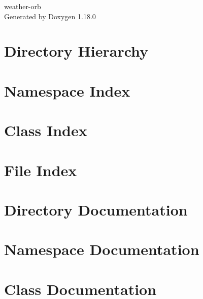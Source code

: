 \documentclass[twoside]{book}
\newcommand{\+}{\discretionary{\mbox{\scriptsize$\hookleftarrow$}}{}{}}
\newcommand{\clearemptydoublepage}{%
    \newpage{\pagestyle{empty}\cleardoublepage}%
  }
\begin{document}
  \raggedbottom
    \hypersetup{pageanchor=false,
                bookmarksnumbered=true,
                pdfencoding=unicode
               }
  \begin{titlepage}
  \vspace*{7cm}
  \begin{center}%
  {\Large weather-\/orb}\\
  \vspace*{1cm}
  {\large Generated by Doxygen 1.18.0}\\
  \end{center}
  \end{titlepage}
  \clearemptydoublepage
  \tableofcontents
  \clearemptydoublepage
  \hypersetup{pageanchor=true}
\chapter{Directory Hierarchy}

\chapter{Namespace Index}

\chapter{Class Index}

\chapter{File Index}

\chapter{Directory Documentation}

\chapter{Namespace Documentation}



\chapter{Class Documentation}






\end{document}
